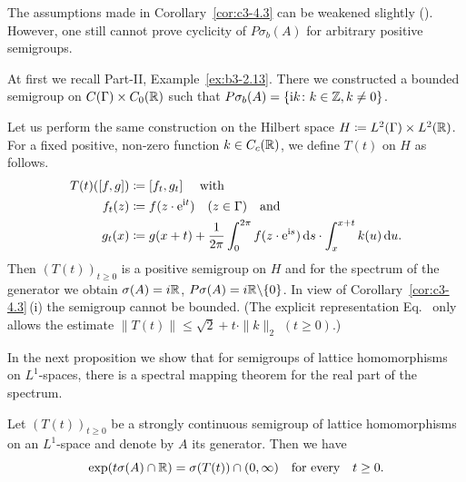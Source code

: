 The assumptions made in Corollary~\ref{cor:c3-4.3} can be weakened slightly (\cf \textcite{greiner:1982}). 
However, one still cannot prove cyclicity of\/ $P\sigma_{b}(A)$ for arbitrary positive semigroups.
\begin{example}\label{ex:c3-4.4}
	At first we recall Part-II, Example~\ref{ex:b3-2.13}. 
	There we constructed a bounded semigroup on $C(\Gamma)\times C_{0}(\mathbb{R} )$ such that $P\sigma_{b}(A) = \{\mathrm{i} k \colon k \in \mathbb{Z}, k \neq 0\}$.

    Let us perform the same construction on the Hilbert space
    $H \coloneq L^2(\Gamma)\times L^2(\mathbb{R} )$.
    For a fixed positive, non-zero function $k \in C_c(\mathbb{R} )$,
    we define $T(t)$ on $H$ as follows.
\begin{equation}\label{eq:c3-4.6}
	\begin{split} 
		T(t)([f,g]) &\coloneq [f_t,g_t] \quad \ \text{with}\\
		f_t(z) &\coloneq f(z \cdot \mathrm{e}^{\mathrm{i} t}) \quad (z \in \Gamma) \quad \text{and}\\
		g_t(x) &\coloneq g(x+t) + \frac{1}{2\pi}\int_{0}^{2\pi} f(z \cdot \mathrm{e}^{\mathrm{i} s}) \mathop{}\!\mathrm{d}{s}  \cdot \int_{x}^{x+t} k(u) \mathop{}\!\mathrm{d}{u}  .
	\end{split}
\end{equation}
Then $(T(t))_{t \geq 0}$ is a positive semigroup on $H$ and for the spectrum of
the generator we obtain $\sigma(A) = i\mathbb{R} $, $P\sigma(A) = i\mathbb{R} \backslash\{0\}$.
In view of Corollary~\ref{cor:c3-4.3}\,(i) the semigroup cannot be bounded.
(The explicit representation Eq.~ only allows the estimate $\|T(t)\| \leq \sqrt{2} + t \cdot \|k\|_2$ $(t\geq 0)$.)
\end{example}
In the next proposition we show that for semigroups of lattice homomorphisms on $L^1$-spaces, there is a spectral mapping theorem for the real part of the spectrum.
\begin{proposition}\label{prop:c3-4.5}
Let $(T(t))_{t \geq 0}$ be a strongly continuous semigroup
of lattice homomorphisms on an $L^1$-space and denote by $A$ its generator.
Then we have
\begin{equation}\label{eq:c3-4.7}
	\exp(t\sigma(A) \cap \R ) = \sigma(T(t)) \cap (0,\infty) \quad \text{for every} \quad t \geq 0 .
\end{equation}
\end{proposition}
